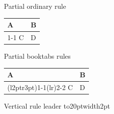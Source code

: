 \documentclass[aspectratio=169]{beamer}
\begin{document}
\begin{frame}{Partial ordinary rule}
  \begin{tabular}{@{}p{30pt}@{}p{30pt}@{}}
    A & B\\
    \cline{1-1}
    C & D
  \end{tabular}
\end{frame}

\begin{frame}{Partial booktabs rules}
  \begin{tabular}{@{}p{30pt}@{}p{30pt}@{}}
    A & B\\
    \cmidrule(l{2pt}r{3pt}){1-1}\cmidrule(lr){2-2}
    C & D
  \end{tabular}
\end{frame}

\begin{frame}{Vertical rule leader}
  \vbox to20pt{\leaders\vrule width2pt\vfill}
\end{frame}
\end{document}
